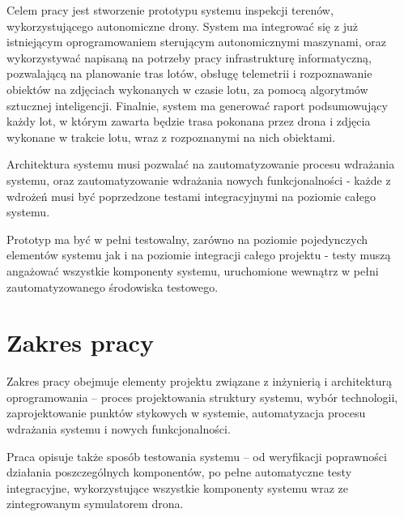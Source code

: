 Celem pracy jest stworzenie prototypu systemu inspekcji terenów, wykorzystującego
autonomiczne drony. System ma integrować się z już istniejącym oprogramowaniem
sterującym autonomicznymi maszynami, oraz wykorzystywać napisaną na potrzeby pracy
infrastrukturę informatyczną, pozwalającą na planowanie tras lotów, obsługę telemetrii
i rozpoznawanie obiektów na zdjęciach wykonanych w czasie lotu, za pomocą algorytmów
sztucznej inteligencji. Finalnie, system ma generować raport podsumowujący każdy lot,
w którym zawarta będzie trasa pokonana przez drona i zdjęcia wykonane w trakcie lotu,
wraz z rozpoznanymi na nich obiektami. 

Architektura systemu musi pozwalać na zautomatyzowanie procesu wdrażania
systemu, oraz zautomatyzowanie wdrażania nowych funkcjonalności - każde
z wdrożeń musi być poprzedzone testami integracyjnymi na poziomie całego systemu. 

Prototyp ma być w pełni testowalny, zarówno na poziomie pojedynczych
elementów systemu jak i na poziomie integracji całego projektu - testy muszą
angażować wszystkie komponenty systemu, uruchomione wewnątrz w pełni
zautomatyzowanego środowiska testowego.

\section{Zakres pracy} \label{intro_scope}

Zakres pracy obejmuje elementy projektu związane z
inżynierią i architekturą oprogramowania -- proces projektowania struktury systemu,
wybór technologii, zaprojektowanie punktów stykowych w systemie, automatyzacja
procesu wdrażania systemu i nowych funkcjonalności.

Praca opisuje także sposób testowania systemu -- od weryfikacji poprawności działania
poszczególnych komponentów, po pełne automatyczne testy integracyjne, wykorzystujące 
wszystkie komponenty systemu wraz ze zintegrowanym symulatorem drona. 
